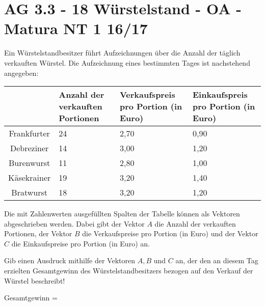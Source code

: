 \section{AG 3.3 - 18 Würstelstand - OA - Matura NT 1 16/17}

\begin{beispiel}[AG 3.3]{1} %
Ein Würstelstandbesitzer führt Aufzeichnungen über die Anzahl der täglich verkauften Würstel. Die Aufzeichnung eines bestimmten Tages ist nachstehend angegeben:

\begin{tabular}{|c|C{3.5cm}|C{3.5cm}|C{3.5cm}|}
&Anzahl der verkauften Portionen&Verkaufspreis pro Portion (in Euro)&Einkaufspreis pro Portion (in Euro)\\ \hline
{}Frankfurter&24&2,70& 0,90\\ \hline
{}Debreziner&14&3,00& 1,20\\ \hline
{}Burenwurst&11&2,80& 1,00\\ \hline
{}Käsekrainer&19&3,20& 1,40\\ \hline
{}Bratwurst&18&3,20& 1,20\\ \hline
\end{tabular}

Die mit Zahlenwerten ausgefüllten Spalten der Tabelle können als Vektoren abgeschrieben werden. Dabei gibt der Vektor $A$ die Anzahl der verkauften Portionen, der Vektor $B$ die Verkaufspreise pro Portion (in Euro) und der Vektor $C$ die Einkaufspreise pro Portion (in Euro) an.

Gib einen Ausdruck mithilfe der Vektoren $A,B$ und $C$ an, der den an diesem Tag erzielten Gesamtgewinn des Würstelstandbesitzers bezogen auf den Verkauf der Würstel beschreibt!

Gesamtgewinn = 
\end{beispiel}
